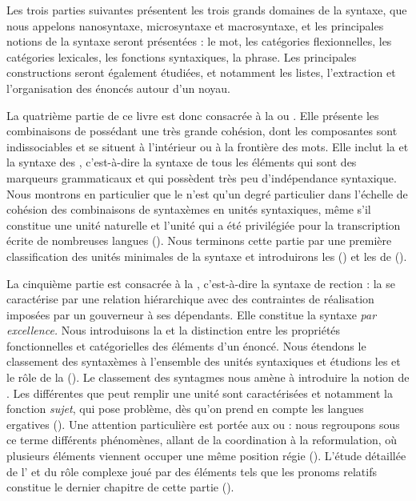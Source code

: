 Les trois parties suivantes présentent les trois grands domaines de la syntaxe, que nous appelons nanosyntaxe, microsyntaxe et macrosyntaxe, et les principales notions de la syntaxe seront présentées : le mot, les catégories flexionnelles, les catégories lexicales, les fonctions syntaxiques, la phrase. Les principales constructions seront également étudiées, et notamment les listes, l’extraction et l’organisation des énoncés autour d’un noyau.

La quatrième partie de ce livre est donc consacrée à la  ou . Elle présente les combinaisons de  possédant une très grande cohésion, dont les composantes sont indissociables et se situent à l’intérieur ou à la frontière des mots. Elle inclut la  et la syntaxe des , c’est-à-dire la syntaxe de tous les éléments qui sont des marqueurs grammaticaux et qui possèdent très peu d’indépendance syntaxique. Nous montrons en particulier que le  n’est qu’un degré particulier dans l’échelle de cohésion des combinaisons de syntaxèmes en unités syntaxiques, même s’il constitue une unité naturelle et l’unité qui a été privilégiée pour la transcription écrite de nombreuses langues (). Nous terminons cette partie par une première classification des unités minimales de la syntaxe et introduirons les  () et les  de  ().

La cinquième partie est consacrée à la , c’est-à-dire la syntaxe de rection : la  se caractérise par une relation hiérarchique avec des contraintes de réalisation imposées par un gouverneur à ses dépendants. Elle constitue la syntaxe \textit{par excellence.} Nous introduisons la  et la distinction entre les propriétés fonctionnelles et catégorielles des éléments d’un énoncé. Nous étendons le classement des syntaxèmes à l’ensemble des unités syntaxiques et étudions les  et le rôle de la  (). Le classement des syntagmes nous amène à introduire la notion de . Les différentes  que peut remplir une unité sont caractérisées et notamment la fonction \textit{sujet}, qui pose problème, dès qu’on prend en compte les langues ergatives (). Une attention particulière est portée aux  ou  : nous regroupons sous ce terme différents phénomènes, allant de la coordination à la reformulation, où plusieurs éléments viennent occuper une même position régie (). L’étude détaillée de l’ et du rôle complexe joué par des éléments tels que les pronoms relatifs constitue le dernier chapitre de cette partie ().

